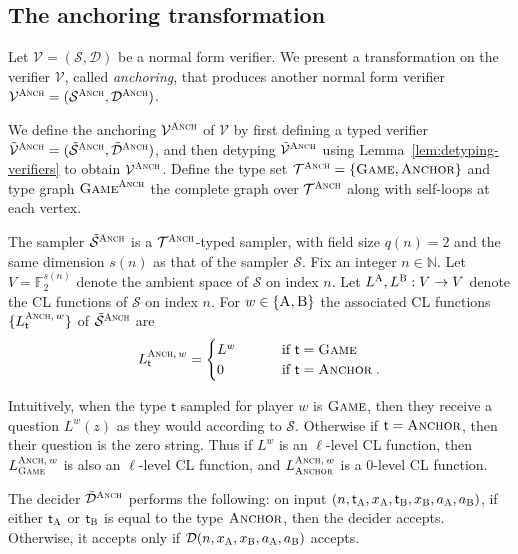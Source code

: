 \documentclass[11pt]{article}
\theoremstyle{definition}
\newcommand{\N}{\ensuremath{\mathbb{N}}}
\newcommand{\F}{\ensuremath{\mathbb{F}}}
\newcommand{\sampler}{\mathcal{S}}
\newcommand{\decider}{\mathcal{D}}
\newcommand{\verifier}{\mathcal{V}}
\newcommand{\type}{\mathcal{T}}
\newcommand{\gamestyle}[1]{\ensuremath{\textsc{#1}}\xspace}
\newcommand{\labelstyle}[1]{\ensuremath{\textsc{#1}}\xspace}
\newcommand{\tvarstyle}[1]{\mathsf{#1}}
\newcommand{\tvar}{\ensuremath{\tvarstyle{t}}}
\newcommand{\alice}{\labelstyle{A}}
\newcommand{\bob}{\labelstyle{B}}
\newcommand{\typestyle}[1]{\ensuremath{\textsc{#1}}\xspace}
\newcommand{\Anchor}{\typestyle{Anchor}}
\renewcommand{\Game}{\typestyle{Game}}
\newcommand{\anch}{\gamestyle{Anch}}
\begin{document}
\subsection{The anchoring transformation} 
\label{sec:anchoring}

Let $\verifier = (\sampler,\decider)$ be a normal form verifier.
We present a transformation on the verifier $\verifier$, called
\emph{anchoring}, that produces another normal form verifier $\verifier^{\anch}
= (\sampler^{\anch},\decider^{\anch})$.

We define the anchoring $\verifier^\anch$ of $\verifier$ by first defining a
typed verifier $\tilde{\verifier}^\anch = (\tilde{\sampler}^\anch,
\tilde{\decider}^\anch)$, and then detyping $\tilde{\verifier}^\anch$ using
Lemma~\ref{lem:detyping-verifiers} to obtain $\verifier^\anch$.
Define the type set $\type^\anch = \{\Game, \Anchor\}$ and type graph
$\Game^\anch$ the complete graph over $\type^\anch$ along with self-loops at
each vertex.

The sampler $\tilde{\sampler}^\anch$ is a $\type^\anch$-typed sampler, with
field size $q(n) = 2$ and the same dimension $s(n)$ as that of the sampler
$\sampler$.
Fix an integer $n \in \N$.
Let $V = \F_2^{s(n)}$ denote the ambient space of $\sampler$ on index $n$.
Let $L^\alice,L^\bob: V \to V$ denote the CL functions of $\sampler$ on index
$n$.
For $w\in\{\alice,\bob\}$ the associated CL functions $\{ L^{\anch,\, w}_\tvar
\}$ of $\tilde{\sampler}^\anch$ are
\[
	L^{\anch,\, w}_\tvar = \begin{cases}
		 L^w & \qquad \text{ if $\tvar = \Game$} \\
		 0 & \qquad \text{ if $\tvar = \Anchor$}\;.
	\end{cases}
\]

Intuitively, when the type $\tvar$ sampled for player $w$ is $\Game$, then they
receive a question $L^w(z)$ as they would according to $\sampler$.
Otherwise if $\tvar = \Anchor$, then their question is the zero string.
Thus if $L^w$ is an $\ell$-level CL function, then $L^{\anch,\, w}_\Game$ is
also an $\ell$-level CL function, and $L^{\anch,\, w}_\Anchor$ is a $0$-level CL
function.

The decider $\tilde{\decider}^\anch$ performs the following: on input
$(n,\tvar_\alice,x_\alice,\tvar_\bob,x_\bob,a_\alice,a_\bob)$, if either
$\tvar_\alice$ or $\tvar_\bob$ is equal to the type $\Anchor$, then the decider
accepts.
Otherwise, it accepts only if $\decider(n,x_\alice,x_\bob,a_\alice,a_\bob)$
accepts.
\end{document}
